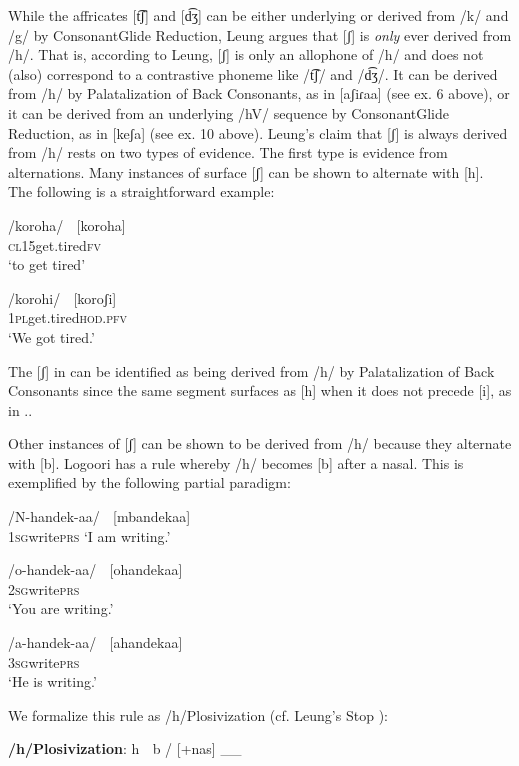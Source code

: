 \documentclass[output=paper]{langsci/langscibook}
\begin{document}
While the affricates [t͡ʃ] and [d͡ʒ] can be either underlying or derived from /k/ and /g/ by ConsonantGlide Reduction, Leung argues that [ʃ] is \textit{only} ever derived from /h/. That is, according to Leung, [ʃ] is only an allophone of /h/ and does not (also) correspond to a contrastive phoneme like /t͡ʃ/ and /d͡ʒ/. It can be derived from /h/ by Palatalization of Back Consonants, as in [aʃiɾaa] (see ex. 6 above), or it can be derived from an underlying /hV/ sequence by ConsonantGlide Reduction, as in [keʃa] (see ex. 10 above). Leung’s claim that [ʃ] is always derived from /h/ rests on two types of evidence. The first type is evidence from alternations. Many instances of surface [ʃ] can be shown to alternate with [h]. The following is a straightforward example:


\ea{}
 /koroha/    [koroha]\\{}
\textsc{cl15}get.tired\textsc{fv}\\{}
\glt ‘to get tired’ \citep[38]{Leung1991}
\z

\ea{}
 /korohi/    [koroʃi]\\{}
\textsc{1pl}get.tired\textsc{hod.pfv}\\{}
\glt ‘We got tired.’ \citep[38]{Leung1991}
\z

The [ʃ] in  can be identified as being derived from /h/ by Palatalization of Back Consonants since the same segment surfaces as [h] when it does not precede [i], as in .. 

Other instances of [ʃ] can be shown to be derived from /h/ because they alternate with [b]. Logoori has a rule whereby /h/ becomes [b] after a nasal. This is exemplified by the following partial paradigm:

\ea{}
/N-handek-aa/    [mbandekaa] \\{}
\textsc{1sg}write\textsc{prs}
\glt ‘I am writing.’
\z

\ea{}
/o-handek-aa/    [ohandekaa]\\{}
\textsc{2sg}write\textsc{prs}\\{}
\glt ‘You are writing.’
\z


\ea{}
/a-handek-aa/    [ahandekaa]\\{}
\textsc{3sg}write\textsc{prs}\\{}
\glt ‘He is writing.’
\z


We formalize this rule as /h/Plosivization (cf. Leung’s Stop \citet[117]{Formation1991}):



\ea{}
\textbf{/h/Plosivization}: h  b / [+nas] \_\_ {\rmfnm}
\z
{}
\end{document}
